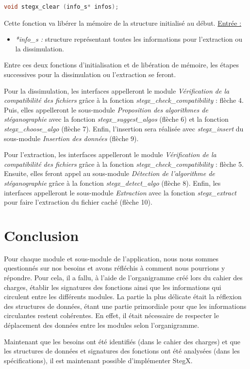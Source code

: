 \documentclass[11pt]{article}
\begin{document}
\begin{lstlisting}[language=c]
void stegx_clear (info_s* infos);
\end{lstlisting}

Cette fonction va libérer la mémoire de la structure initialisé au début. 
\newline
\underline{Entrée :} 
\begin{itemize}
\item \textit{*info\_s :} structure représentant toutes les informations 
pour l'extraction ou la dissimulation. 
\end{itemize} 

Entre ces deux fonctions d'initialisation et de libération de mémoire, 
les étapes successives pour la dissimulation ou l'extraction se feront. 

Pour la dissimulation, les interfaces appelleront le module 
\textit{Vérification de la compatibilité des fichiers} grâce à la fonction 
\textit{stegx\_check\_compatibility} : flèche 4. 
Puis, elles appelleront le sous-module 
\textit{Proposition des algorithmes de stéganographie} avec la fonction 
\textit{stegx\_suggest\_algos} (flèche 6) et la fonction 
\textit{stegx\_choose\_algo} (flèche 7). 
Enfin, l'insertion sera réalisée avec \textit{stegx\_insert} du sous-module 
\textit{Insertion des données} (flèche 9). 

Pour l'extraction, les interfaces appelleront le module 
\textit{Vérification de la compatibilité des fichiers} grâce à la fonction 
\textit{stegx\_check\_compatibility} : flèche 5. 
Ensuite, elles feront appel au sous-module 
\textit{Détection de l'algorithme de stéganographie} grâce à la fonction 
\textit{stegx\_detect\_algo} (flèche 8).
Enfin, les interfaces appelleront le sous-module \textit{Extraction} avec la 
fonction \textit{stegx\_extract} pour faire l'extraction du fichier caché 
(flèche 10). 

\section{Conclusion}

Pour chaque module et sous-module de l'application, nous nous sommes questionnés
sur nos besoins et avons réfléchis à comment nous pourrions y répondre. Pour
cela, il a fallu, à l'aide de l'organigramme créé lors du cahier des charges,
établir les signatures des fonctions ainsi que les informations qui circulent
entre les différents modules.  La partie la plus délicate était la réflexion des
structures de données, étant une partie primordiale pour que les informations
circulantes restent cohérentes. En effet, il était nécessaire de respecter le
déplacement des données entre les modules selon l'organigramme. 

Maintenant que les besoins ont été identifiés (dans le cahier des charges) et
que les structures de données et signatures des fonctions ont été analysées
(dans les spécifications), il est maintenant possible d'implémenter StegX. 
\end{document}
